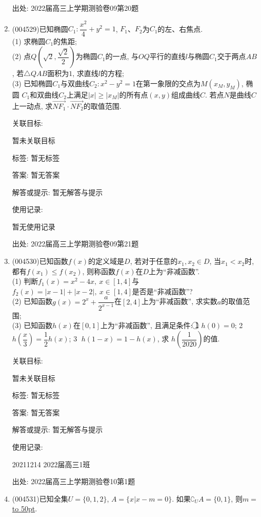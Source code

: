 \documentclass[10pt,a4paper]{article}
\newcommand{\blank}[1]{\underline{\hbox to #1pt{}}}
\begin{document}
\begin{enumerate}[1.]
出处: 2022届高三上学期测验卷09第20题
\item { (004529)}已知椭圆$C_1:\dfrac{x^2}4+{y^2}=1$, $F_1$、$F_2$为$C_1$的左、右焦点.\\
(1) 求椭圆$C_1$的焦距;\\
(2) 点$Q(\sqrt 2, \dfrac{\sqrt 2}2)$为椭圆$C_1$的一点, 与$OQ$平行的直线$l$与椭圆$C_1$交于两点$AB$, 若$\triangle QAB$面积为$1$, 求直线$l$的方程;\\
(3) 已知椭圆$C_1$与双曲线$C_2:x^2-y^2=1$在第一象限的交点为$M(x_M,y_M)$, 椭圆 $C_1$和双曲线$C_2$上满足$|x|\ge |x_M|$的所有点$(x,y)$组成曲线$C$. 若点$N$是曲线$C$上一动点, 求$\overrightarrow{NF_1}\cdot \overrightarrow{NF_2}$的取值范围.


关联目标:

暂未关联目标



标签: 暂无标签

答案: 暂无答案

解答或提示: 暂无解答与提示

使用记录:

暂无使用记录


出处: 2022届高三上学期测验卷09第21题
\item { (004530)}已知函数$f(x)$的定义域是$D$, 若对于任意的$x_1,x_2\in D$, 当$x_1<x_2$时, 都有$f(x_1)\le f(x_2)$, 则称函数$f(x)$在$D$上为``非减函数''.\\
(1) 判断$f_1(x)=x^2-4x, \ x\in [1,4]$与$f_2(x)=|x-1|+|x-2|, \ x\in [1,4]$是否是``非减函数''?\\
(2) 已知函数$g(x)=2^x+\dfrac a{2^{x-1}}$在$[2,4]$上为``非减函数'', 求实数$a$的取值范围;\\
(3) 已知函数$h(x)$在$[0,1]$上为``非减函数'', 且满足条件:
\textcircled{1}  $h(0)=0$; \textcircled{2}  $h(\dfrac x3)=\dfrac 12h(x)$; \textcircled{3}  $h(1-x)=1-h(x)$, 求 $h(\dfrac 1{2020})$的值.


关联目标:

暂未关联目标



标签: 暂无标签

答案: 暂无答案

解答或提示: 暂无解答与提示

使用记录:

20211214	2022届高三1班	


出处: 2022届高三上学期测验卷10第1题
\item { (004531)}已知全集$U=\{0,1,2\}$, $A=\{x|x-m=0\}$. 如果$\complement_U A=\{0,1\}$, 则$m=$\blank{50}.



\end{enumerate}
\end{document}
